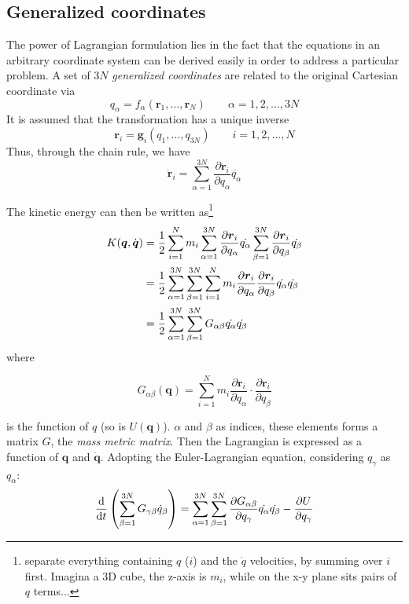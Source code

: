 \documentclass[
  10pt,
  twoside,
  openany,
  b5paper, %
  colorscheme = bootstrap-v4, %
]{qyxf-book}
\newcommand{\der}[2]{\dfrac{\md #1}{\md #2}}
\newcommand{\p}[2]{\dfrac{\partial #1}{\partial #2}}
\newcommand{\md}{\mathrm{d}}
\newcommand{\vr}{\boldsymbol{r}}
\newcommand{\dvr}{\dot{\vr}}
\newcommand{\half}{\dfrac{1}{2}}
\newcommand{\sumin}{\sum_{i=1}^N}
\newcommand{\suman}{\sum_{\alpha=1}^{3N}}
\begin{document}
\subsection{Generalized coordinates}
The power of Lagrangian formulation lies in the fact that the equations in an arbitrary coordinate system can be derived easily in order to address a particular problem. A set of $3N$ \textit{generalized coordinates} are related to the original Cartesian coordinate via
\begin{equation}
	q_\alpha = f_\alpha(\vr_1,\dots,\vr_N)\qquad \alpha=1,2,\dots,3N
\end{equation}
It is assumed that the transformation has a unique inverse
\begin{equation}
	\vr_i=\boldsymbol{g}_i(q_1,\dots,q_{3N})\qquad i=1,2,\dots,N
\end{equation}
Thus, through the chain rule, we have
\begin{equation}
	\dvr_i=\suman\p{\vr_i}{q_\alpha}\dot{q_\alpha}
\end{equation}

The kinetic energy can then be written as\footnote{separate everything containing $q$ ($i$) and the $\dot{q}$ velocities, by summing over $i$ first. Imagina a 3D cube, the z-axis is $m_i$, while on the x-y plane sits pairs of $q$ terms...}
\begin{align}
	K(\boldsymbol{q},\dot{\boldsymbol{q}})&=\half\sumin m_i\suman\p{\vr_i}{q_\alpha}\dot{q_\alpha}\sum_{\beta=1}^{3N}\p{\vr_i}{q_\beta}\dot{q_\beta} \notag\\
	&=\half\suman\sum_{\beta=1}^{3N}\sumin m_i\p{\vr_i}{q_\alpha}\p{\vr_i}{q_\beta}\dot{q_\alpha}\dot{q_\beta} \notag\\
	&=\half\suman\sum_{\beta=1}^{3N}G_{\alpha\beta}\dot{q_\alpha}\dot{q_\beta}
\end{align}
where
\begin{tcolorbox}
	\begin{equation}
		G_{\alpha\beta}(\boldsymbol{q})=\sumin m_i\p{\vr_i}{q_\alpha}\cdot\p{\vr_i}{q_\beta}
	\end{equation}
\end{tcolorbox}
is the function of $q$ (so is $U(\boldsymbol{q})$). $\alpha$ and $\beta$ as indices, these elements forms a matrix $G$, the \textit{mass metric matrix}. Then the Lagrangian is expressed as a function of $\boldsymbol{q}$ and $\dot{\boldsymbol{q}}$. Adopting the Euler-Lagrangian equation, considering $q_{\gamma}$ as $q_\alpha$:
\begin{equation}
	\der{}{t}\left(\sum_{\beta=1}^{3N}G_{\gamma\beta}\dot{q}_\beta\right)=\suman\sum_{\beta=1}^{3N}\p{G_{\alpha\beta}}{q_\gamma}\dot{q_\alpha}\dot{q_\beta}-\p{U}{q_\gamma}\\
\end{equation}
\end{document}
